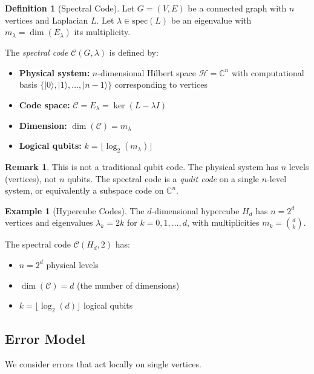 \documentclass[11pt,a4paper]{article}
\theoremstyle{definition}
\newtheorem{definition}[theorem]{Definition}
\newtheorem{example}[theorem]{Example}
\newtheorem{remark}[theorem]{Remark}
\newcommand{\C}{\mathbb{C}}
\newcommand{\hilbert}{\mathcal{H}}
\newcommand{\spec}{\mathrm{spec}}
\newcommand{\codespace}{\mathcal{C}}
\newcommand{\ket}[1]{|#1\rangle}
\begin{document}
\begin{definition}[Spectral Code]
\label{def:spectral_code}
Let $G = (V, E)$ be a connected graph with $n$ vertices and Laplacian $L$. Let $\lambda \in \spec(L)$ be an eigenvalue with $m_\lambda = \dim(E_\lambda)$ its multiplicity.

The \emph{spectral code} $\codespace(G, \lambda)$ is defined by:
\begin{itemize}[noitemsep]
    \item \textbf{Physical system:} $n$-dimensional Hilbert space $\hilbert = \C^n$ with computational basis $\{\ket{0}, \ket{1}, \ldots, \ket{n-1}\}$ corresponding to vertices
    \item \textbf{Code space:} $\codespace = E_\lambda = \ker(L - \lambda I)$
    \item \textbf{Dimension:} $\dim(\codespace) = m_\lambda$
    \item \textbf{Logical qubits:} $k = \lfloor \log_2(m_\lambda) \rfloor$
\end{itemize}
\end{definition}

\begin{remark}
This is not a traditional qubit code. The physical system has $n$ levels (vertices), not $n$ qubits. The spectral code is a \emph{qudit code} on a single $n$-level system, or equivalently a subspace code on $\C^n$.
\end{remark}

\begin{example}[Hypercube Codes]
The $d$-dimensional hypercube $H_d$ has $n = 2^d$ vertices and eigenvalues $\lambda_k = 2k$ for $k = 0, 1, \ldots, d$, with multiplicities $m_k = \binom{d}{k}$.

The spectral code $\codespace(H_d, 2)$ has:
\begin{itemize}[noitemsep]
    \item $n = 2^d$ physical levels
    \item $\dim(\codespace) = d$ (the number of dimensions)
    \item $k = \lfloor \log_2(d) \rfloor$ logical qubits
\end{itemize}
\end{example}

\subsection{Error Model}

We consider errors that act locally on single vertices.
\end{document}
